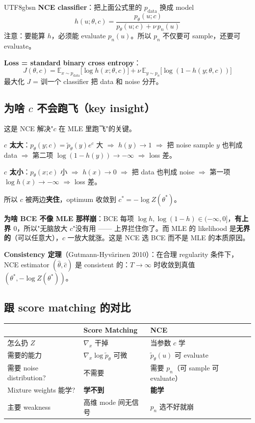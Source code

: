 \documentclass[11pt]{article}
\begin{document}
\begin{CJK}{UTF8}{gbsn}
\textbf{NCE classifier}：把上面公式里的 $p_{\text{data}}$ 换成 model
\[
h(u; \theta, c) = \frac{p_\theta(u; c)}{p_\theta(u; c) + \nu \, p_n(u)}
\]
注意：要能算 $h$，必须能 evaluate $p_n(u)$。所以 $p_n$ 不仅要可 sample，还要可 evaluate。

\textbf{Loss = standard binary cross entropy}：
\[
\boxed{
J(\theta, c) = \mathbb{E}_{x \sim p_{\text{data}}}\!\big[\log h(x; \theta, c)\big] + \nu \, \mathbb{E}_{y \sim p_n}\!\big[\log(1 - h(y; \theta, c))\big]
}
\]
最大化 $J$ = 训一个 classifier 把 data 和 noise 分开。

\subsection{为啥 $c$ 不会跑飞（key insight）}

这是 NCE 解决"$c$ 在 MLE 里跑飞"的关键。

\textbf{$c$ 太大}：$p_\theta(y; c) = \tilde{p}_\theta(y) e^c$ 大 $\Rightarrow$ $h(y) \to 1$ $\Rightarrow$ 把 noise sample $y$ 也判成 data $\Rightarrow$ 第二项 $\log(1-h(y)) \to -\infty$ $\Rightarrow$ loss 差。

\textbf{$c$ 太小}：$p_\theta(x; c)$ 小 $\Rightarrow$ $h(x) \to 0$ $\Rightarrow$ 把 data 也判成 noise $\Rightarrow$ 第一项 $\log h(x) \to -\infty$ $\Rightarrow$ loss 差。

所以 $c$ 被两边\textbf{夹住}，optimum 收敛到 $c^* = -\log Z(\theta^*)$。

\textbf{为啥 BCE 不像 MLE 那样崩}：BCE 每项 $\log h, \log(1-h) \in (-\infty, 0]$，\textbf{有上界 $0$}，所以"无脑放大 $c$"没有用 —— 上界拦住你了。而 MLE 的 likelihood 是\textbf{无界的}（可以任意大），$c$ 一放大就涨。这是 NCE 选 BCE 而不是 MLE 的本质原因。

\textbf{Consistency 定理}（Gutmann-Hyvärinen 2010）：在合理 regularity 条件下，NCE estimator $(\hat\theta, \hat c)$ 是 consistent 的：$T \to \infty$ 时收敛到真值 $(\theta^*, -\log Z(\theta^*))$。

\subsection{跟 score matching 的对比}

\begin{center}
\begin{tabular}{|l|l|l|}
\hline
 & Score Matching & NCE \\
\hline
怎么扔 $Z$ & $\nabla_x$ 干掉 & 当参数 $c$ 学 \\
需要的能力 & $\nabla_x \log \tilde{p}_\theta$ 可微 & $\tilde{p}_\theta(u)$ 可 evaluate \\
需要 noise distribution? & 不需要 & 需要 $p_n$（可 sample 可 evaluate） \\
Mixture weights 能学? & \textbf{学不到} & \textbf{能学} \\
主要 weakness & 高维 mode 间无信号 & $p_n$ 选不好就崩 \\
\hline
\end{tabular}
\end{center}


\end{CJK}
\end{document}

